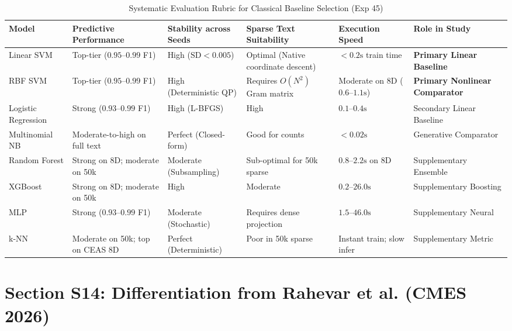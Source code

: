 \documentclass[10pt,letterpaper]{article}
\begin{document}
\begin{table}[h!]
\centering
\small
\caption{Systematic Evaluation Rubric for Classical Baseline Selection (Exp 45)}
\label{tab:supp_selection_rubric}
\begin{tabular}{p{2.5cm}p{2.5cm}p{2.2cm}p{2.2cm}p{2.5cm}p{2.5cm}}
\toprule
\textbf{Model} & \textbf{Predictive Performance} & \textbf{Stability across Seeds} & \textbf{Sparse Text Suitability} & \textbf{Execution Speed} & \textbf{Role in Study} \\
\midrule
Linear SVM & Top-tier ($0.95\text{--}0.99$ F1) & High ($\text{SD} < 0.005$) & Optimal (Native coordinate descent) & $<0.2\text{s}$ train time & \textbf{Primary Linear Baseline} \\
RBF SVM & Top-tier ($0.95\text{--}0.99$ F1) & High (Deterministic QP) & Requires $O(N^2)$ Gram matrix & Moderate on 8D ($0.6\text{--}1.1\text{s}$) & \textbf{Primary Nonlinear Comparator} \\
Logistic Regression & Strong ($0.93\text{--}0.99$ F1) & High (L-BFGS) & High & $0.1\text{--}0.4\text{s}$ & Secondary Linear Baseline \\
Multinomial NB & Moderate-to-high on full text & Perfect (Closed-form) & Good for counts & $<0.02\text{s}$ & Generative Comparator \\
Random Forest & Strong on 8D; moderate on 50k & Moderate (Subsampling) & Sub-optimal for 50k sparse & $0.8\text{--}2.2\text{s}$ on 8D & Supplementary Ensemble \\
XGBoost & Strong on 8D; moderate on 50k & High & Moderate & $0.2\text{--}26.0\text{s}$ & Supplementary Boosting \\
MLP & Strong ($0.93\text{--}0.99$ F1) & Moderate (Stochastic) & Requires dense projection & $1.5\text{--}46.0\text{s}$ & Supplementary Neural \\
k-NN & Moderate on 50k; top on CEAS 8D & Perfect (Deterministic) & Poor in 50k sparse & Instant train; slow infer & Supplementary Metric \\
\bottomrule
\end{tabular}
\end{table}

\section{Section S14: Differentiation from Rahevar et al. (CMES 2026)}
\label{sec:supp_differentiation}
\end{document}
